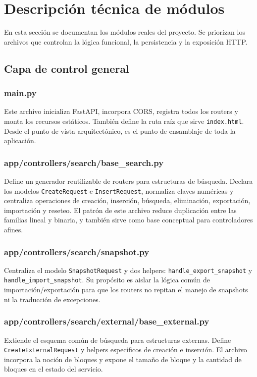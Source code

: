 \documentclass[12pt,onecolumn]{IEEEtran}
\begin{document}
\section{Descripción técnica de módulos}
En esta sección se documentan los módulos reales del proyecto. Se priorizan los archivos que controlan la lógica funcional, la persistencia y la exposición HTTP.

\subsection{Capa de control general}
\subsubsection{main.py}
Este archivo inicializa FastAPI, incorpora CORS, registra todos los routers y monta los recursos estáticos. También define la ruta raíz que sirve \texttt{index.html}. Desde el punto de vista arquitectónico, es el punto de ensamblaje de toda la aplicación.

\subsubsection{app/controllers/search/base\_search.py}
Define un generador reutilizable de routers para estructuras de búsqueda. Declara los modelos \texttt{CreateRequest} e \texttt{InsertRequest}, normaliza claves numéricas y centraliza operaciones de creación, inserción, búsqueda, eliminación, exportación, importación y reseteo. El patrón de este archivo reduce duplicación entre las familias lineal y binaria, y también sirve como base conceptual para controladores afines.

\subsubsection{app/controllers/search/snapshot.py}
Centraliza el modelo \texttt{SnapshotRequest} y dos helpers: \texttt{handle\_export\_snapshot} y \texttt{handle\_import\_snapshot}. Su propósito es aislar la lógica común de importación/exportación para que los routers no repitan el manejo de snapshots ni la traducción de excepciones.

\subsubsection{app/controllers/search/external/base\_external.py}
Extiende el esquema común de búsqueda para estructuras externas. Define \texttt{CreateExternalRequest} y helpers específicos de creación e inserción. El archivo incorpora la noción de bloques y expone el tamaño de bloque y la cantidad de bloques en el estado del servicio.
\end{document}

